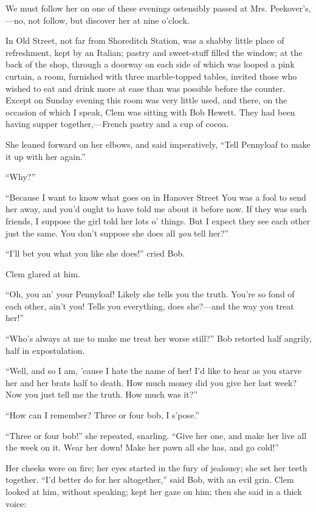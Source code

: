 We must follow her on one of these evenings ostensibly passed at Mrs.
Peekover's,---no, not follow, but discover her at nine o'clock.

In Old Street, not far from Shoreditch Station, was a shabby little
place of refreshment, kept by an Italian; pastry and sweet-stuff filled
the window; at the back of the shop, through a doorway on each side of
which was looped a pink curtain, a room, furnished with three
marble-topped tables, invited those who wished to eat and drink more at
ease than was possible before the counter. Except on Sunday evening this
room was very little used, and there, on the occasion of which I speak,
Clem was sitting with Bob Hewett. They had been having supper
together,---French pastry and a cup of cocoa.

She leaned forward on her elbows, and said {}imperatively, ``Tell
Pennyloaf to make it up with her again.''

``Why?''

``Because I want to know what goes on in Hanover Street You was a fool
to send her away, and you'd ought to have told me about it before now.
If they was such friends, I suppose the girl told her lots o' things.
But I expect they see each other just the same. You don't suppose she
does all \emph{you} tell her?''

``I'll bet you what you like she does!'' cried Bob.

Clem glared at him.

``Oh, you an' your Pennyloaf! Likely she tells you the truth. You're so
fond of each other, ain't you! Tells you everything, does she?---and the
way you treat her!''

``Who's always at me to make me treat her worse still?'' Bob retorted
half angrily, half in expostulation.

``Well, and so I am, 'cause I hate the name of her! I'd like to hear as
you starve her and her brats half to death. How much money did you give
her last week? Now you just tell me the truth. How much was it?''

{}``How can I remember? Three or four bob, I s'pose.''

``Three or four bob!'' she repeated, snarling. ``Give her one, and make
her live all the week on it. Wear her down! Make her pawn all she has,
and go cold!''

Her cheeks were on fire; her eyes started in the fury of jealousy; she
set her teeth together. ``I'd better do for her altogether,'' said Bob,
with an evil grin. Clem looked at him, without speaking; kept her gaze
on him; then she said in a thick voice:

